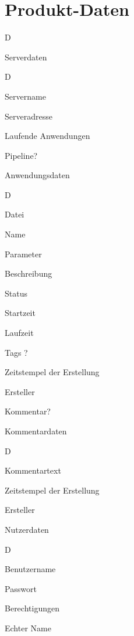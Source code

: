 \section{Produkt-Daten}

\begin{anforderung}{D}
	\item \label{server_daten} Serverdaten
	\begin{subanforderung}{D}
		\item Servername
		\item Serveradresse
		\item Laufende Anwendungen
		\item Pipeline?
		\item 
	\end{subanforderung}
		
    \item \label{anwendungs_daten} Anwendungsdaten
    \begin{subanforderung}{D}
    	\item Datei
        \item Name
        \item Parameter
        \item Beschreibung
        \item Status
        \item Startzeit
        \item Laufzeit
        \item Tags ?
        \item Zeitstempel der Erstellung
        \item \label{experiment_ersteller} Ersteller
        \item Kommentar?
    \end{subanforderung}

    \item \label{kommentar_daten} Kommentardaten
    \begin{subanforderung}{D}
        \item Kommentartext
        \item Zeitstempel der Erstellung
        \item \label{kommentar_ersteller} Ersteller
    \end{subanforderung}

    \item \label{nutzer_daten}Nutzerdaten
    \begin{subanforderung}{D}
        \item Benutzername
        \item Passwort
        \item Berechtigungen
        \item Echter Name
    \end{subanforderung}
\end{anforderung}
\newpage
